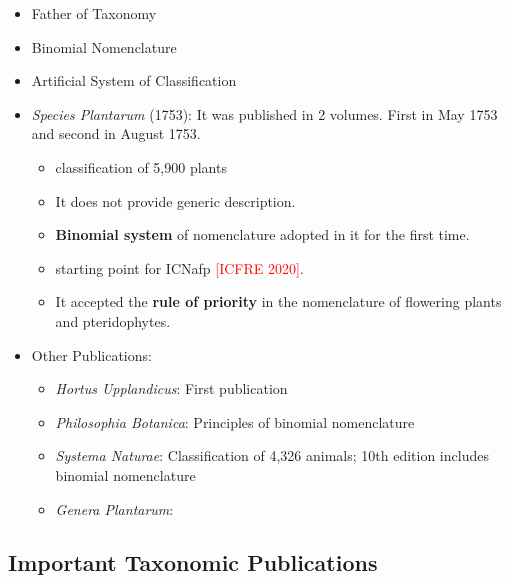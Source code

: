 \documentclass[
]{book}
\providecommand{\tightlist}{%
  \setlength{\itemsep}{0pt}\setlength{\parskip}{0pt}}
\begin{document}
\begin{itemize}
\item
  Father of Taxonomy
\item
  Binomial Nomenclature
\item
  Artificial System of Classification
\item
  \emph{Species Plantarum} (1753): It was published in 2 volumes. First in May 1753 and second in August 1753.

  \begin{itemize}
  \tightlist
  \item
    classification of 5,900 plants
  \item
    It does not provide generic description.
  \item
    \textbf{Binomial system} of nomenclature adopted in it for the first time.
  \item
    starting point for ICNafp \textcolor{red}{[ICFRE 2020]}.
  \item
    It accepted the \textbf{rule of priority} in the nomenclature of flowering plants and pteridophytes.
  \end{itemize}
\item
  Other Publications:

  \begin{itemize}
  \tightlist
  \item
    \emph{Hortus Upplandicus}: First publication
  \item
    \emph{Philosophia Botanica}: Principles of binomial nomenclature
  \item
    \emph{Systema Naturae}: Classification of 4,326 animals; 10th edition includes binomial nomenclature
  \item
    \emph{Genera Plantarum}:
  \end{itemize}
\end{itemize}

\hypertarget{important-taxonomic-publications}{%
\subsection{Important Taxonomic Publications}\label{important-taxonomic-publications}}
\end{document}

